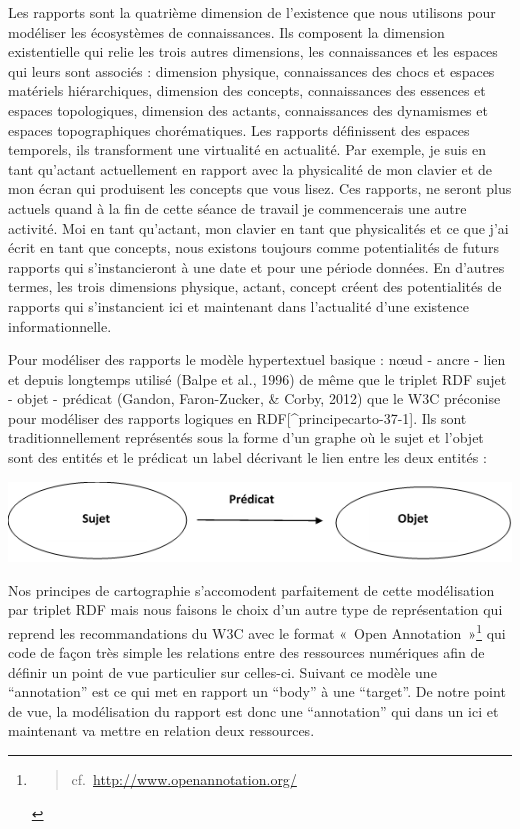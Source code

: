 \documentclass[
  a4paper,
  DIV=11,
  numbers=noendperiod]{scrreprt}
\begin{document}
Les rapports sont la quatrième dimension de l'existence que nous
utilisons pour modéliser les écosystèmes de connaissances. Ils composent
la dimension existentielle qui relie les trois autres dimensions, les
connaissances et les espaces qui leurs sont associés : dimension
physique, connaissances des chocs et espaces matériels hiérarchiques,
dimension des concepts, connaissances des essences et espaces
topologiques, dimension des actants, connaissances des dynamismes et
espaces topographiques chorématiques. Les rapports définissent des
espaces temporels, ils transforment une virtualité en actualité. Par
exemple, je suis en tant qu'actant actuellement en rapport avec la
physicalité de mon clavier et de mon écran qui produisent les concepts
que vous lisez. Ces rapports, ne seront plus actuels quand à la fin de
cette séance de travail je commencerais une autre activité. Moi en tant
qu'actant, mon clavier en tant que physicalités et ce que j'ai écrit en
tant que concepts, nous existons toujours comme potentialités de futurs
rapports qui s'instancieront à une date et pour une période données. En
d'autres termes, les trois dimensions physique, actant, concept créent
des potentialités de rapports qui s'instancient ici et maintenant dans
l'actualité d'une existence informationnelle.

Pour modéliser des rapports le modèle hypertextuel basique : nœud -
ancre - lien et depuis longtemps utilisé (Balpe et al., 1996) de même
que le triplet RDF sujet - objet - prédicat (Gandon, Faron-Zucker, \&
Corby, 2012) que le W3C préconise pour modéliser des rapports logiques
en RDF{[}\^{}principecarto-37-1{]}. Ils sont traditionnellement
représentés sous la forme d'un graphe où le sujet et l'objet sont des
entités et le prédicat un label décrivant le lien entre les deux entités
: \begin{center}
\includegraphics{images/Schema_triplet.png}
\end{center}

Nos principes de cartographie s'accomodent parfaitement de cette
modélisation par triplet RDF mais nous faisons le choix d'un autre type
de représentation qui reprend les recommandations du W3C avec le format
«~Open Annotation~»\footnote{\begin{quote}
  cf.~\url{http://www.openannotation.org/}
  \end{quote}} qui code de façon très simple les relations entre des
ressources numériques afin de définir un point de vue particulier sur
celles-ci. Suivant ce modèle une ``annotation'' est ce qui met en
rapport un ``body'' à une ``target''. De notre point de vue, la
modélisation du rapport est donc une ``annotation'' qui dans un ici et
maintenant va mettre en relation deux ressources.
\end{document}
